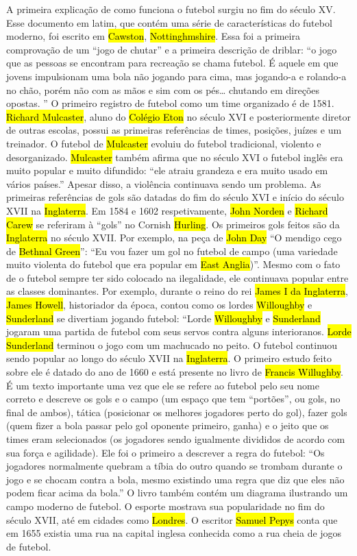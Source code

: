 \documentclass[a4paper,12pt]{article}
\begin{document}
A primeira explicação de como funciona o futebol surgiu no fim do século XV. Esse documento em latim, que contém uma série de características do futebol moderno, foi escrito em \hl{Cawston}, \hl{Nottinghmshire}. Essa foi a primeira comprovação de um “jogo de chutar” e a primeira descrição de driblar: “o jogo que as pessoas se encontram para recreação se chama futebol. É aquele em que jovens impulsionam uma bola não jogando para cima, mas jogando-a e rolando-a no chão, porém não com as mãos e sim com os pés… chutando em direções opostas. ”
O primeiro registro de futebol como um time organizado é de 1581. \hl{Richard Mulcaster}, aluno do \hl{Colégio Eton} no século XVI e posteriormente diretor de outras escolas, possui as primeiras referências de times, posições, juízes e um treinador. O futebol de \hl{Mulcaster} evoluiu do futebol tradicional, violento e desorganizado. \hl{Mulcaster} também afirma que no século XVI o futebol inglês era muito popular e muito difundido: “ele atraiu grandeza e era muito usado em vários países.” Apesar disso, a violência continuava sendo um problema.
As primeiras referências de gols são datadas do fim do século XVI e início do século XVII na \hl{Inglaterra}. Em 1584 e 1602 respetivamente, \hl{John Norden} e \hl{Richard Carew} se referiram à “gols” no Cornish \hl{Hurling}. Os primeiros gols feitos são da \hl{Inglaterra} no século XVII. Por exemplo, na peça de \hl{John Day} “O mendigo cego de \hl{Bethnal Green}”: “Eu vou fazer um gol no futebol de campo (uma variedade muito violenta do futebol que era popular em \hl{East Anglia})”. 
Mesmo com o fato de o futebol sempre ter sido colocado na ilegalidade, ele continuava popular entre as classes dominantes. Por exemplo, durante o reino do rei \hl{James I da Inglaterra}, \hl{James Howell}, historiador da época, contou como os lordes \hl{Willoughby} e \hl{Sunderland} se divertiam jogando futebol: “Lorde \hl{Willoughby} e \hl{Sunderland} jogaram uma partida de futebol com seus servos contra alguns interioranos. \hl{Lorde Sunderland} terminou o jogo com um machucado no peito.
O futebol continuou sendo popular ao longo do século XVII na \hl{Inglaterra}. O primeiro estudo feito sobre ele é datado do ano de 1660 e está presente no livro de \hl{Francis Willughby}. É um texto importante uma vez que ele se refere ao futebol pelo seu nome correto e descreve os gols e o campo (um espaço que tem “portões”, ou gols, no final de ambos), tática (posicionar os melhores jogadores perto do gol), fazer gols (quem fizer a bola passar pelo gol oponente primeiro, ganha) e o jeito que os times eram selecionados (os jogadores sendo igualmente divididos de acordo com sua força e agilidade). Ele foi o primeiro a descrever a regra do futebol: “Os jogadores normalmente quebram a tíbia do outro quando se trombam durante o jogo e se chocam contra a bola, mesmo existindo uma regra que diz que eles não podem ficar acima da bola.” O livro também contém um diagrama ilustrando um campo moderno de futebol. O esporte mostrava sua popularidade no fim do século XVII, até em cidades como \hl{Londres}. O escritor \hl{Samuel Pepys} conta que em 1655 existia uma rua na capital inglesa conhecida como a rua cheia de jogos de futebol.
\end{document}
